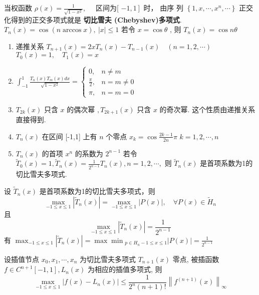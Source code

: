 \documentclass[10pt]{yerbaformat}
\begin{document}
\begin{definition}
    当权函数 $\rho(x)=\frac{1}{\sqrt{1-x^{2}}}, \quad$ 区间为[ $\left.-1,1\right]$ 时， 由序
    列 $\left\{1, x, \cdots, x^{n}, \cdots\right\}$ 正交化得到的正交多项式就是 \textbf{切比雪夫
        (Chebyshev)多项式}. $T_{n}(x)=\cos (n \arccos x), \ |x| \leq 1$ 若令 $x=\cos \theta$ , 则 $T_{n}(x)=\cos n \theta$

    \begin{enumerate}
        \item 递推关系 $T_{n+1}(x)=2 x T_{n}(x)-T_{n-1}(x) \quad(n=1,2, \cdots)$
              $T_{0}(x)=1, \quad T_{1}(x)=x$
        \item $\int_{-1}^{1} \frac{T_{n}(x) T_{m}(x) d x}{\sqrt{1-x^{2}}}=\left\{\begin{array}{ll}0, & n \neq m \\ \frac{\pi}{2}, & n=m \neq 0 \\ \pi, & n=m=0\end{array}\right.$
        \item $T_{2 k}(x)$ 只含 $x$ 的偶次幂 $, T_{2 k+1}(x)$ 只含 $x$ 的奇次幂. 这个性质由递推关系直接得到.
        \item $T_{n}(x)$ 在区间 [-1,1] 上有 $n$ 个零点 $x_{k}=\cos \frac{2 k-1}{2 n} \pi $ $k=1,2, \cdots, n$
        \item $T_{n}(x)$ 的首项 $x^{n}$ 的系数为 $2^{n-1}$
              若令 $\widetilde{T}_{0}(x)=1, \widetilde{T}_{n}(x)=\frac{1}{2^{n-1}} T_{n}(x), n=1,2, \cdots,$
              则 $\widetilde{T}_{n}(x)$ 是首项系数为1的切比雪夫多项式.
    \end{enumerate}
\end{definition}

\begin{theorem}
    设 $\widetilde{T}_{n}(x)$ 是首项系数为1的切比雪夫多项式，则
    $$
        \max _{-1 \leq x \leq 1}\left|\widetilde{T}_{n}(x)\right|=\max _{-1 \leq x \leq 1}|P(x)|, \quad \forall P(x) \in \widetilde{H}_{n}
    $$
    且
    $$
        \max _{-1 \leq x \leq 1}\left|\widetilde{T}_{n}(x)\right|=\frac{1}{2^{n-1}}
    $$ 有 $\max _{-1 \leq x \leq 1}\left|\widetilde{T}_{n}(x)\right|={\max \min}_{p \in H_{n}-1 \leq x \leq 1}|P(x)|=\frac{1}{2^{n-1}}$
\end{theorem}

\begin{theorem}
    设插值节点 $x_{0}, x_{1}, \cdots, x_{n}$ 为切比雪夫多项式 $T_{n+1}(x)$ 零点, 被插函数 $f \in C^{n+1}[-1,1], L_{n}(x)$ 为相应的插值多项式, 则
    $$
        \max _{-1 \leq x \leq 1}\left|f(x)-L_{n}(x)\right| \leq \frac{1}{2^{n}(n+1) !}\left\|f^{(n+1)}(x)\right\|_{\infty}
    $$
\end{theorem}
\end{document}
